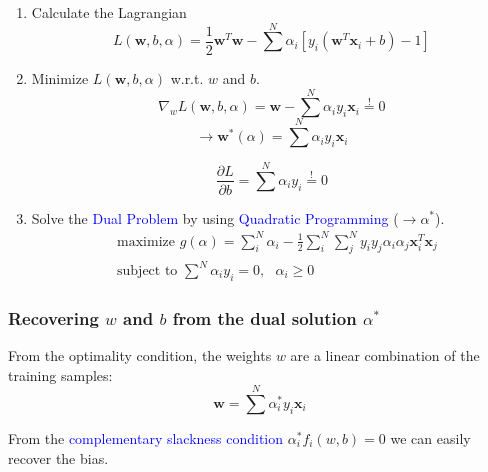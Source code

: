 \documentclass[a4paper,10pt,twoside=true,DIV=10,headsepline,plainheadsepline]{scrartcl}
\begin{document}
		\begin{enumerate}
			\item Calculate the Lagrangian
				\begin{equation} 
					L(\mathbf{w}, b, \alpha) = \frac{1}{2} \mathbf{w}^T \mathbf{w} - \sum^N \alpha_i [y_i(\mathbf{w}^T \mathbf{x}_i + b) - 1]
				\end{equation}
			\item Minimize $L(\mathbf{w}, b, \alpha)$ w.r.t. $w$ and $b$.
				\begin{equation} 
					\nabla_w L(\mathbf{w}, b, \alpha) = \mathbf{w} - \sum^N \alpha_i y_i \mathbf{x}_i \overset{!}{=} 0
				\end{equation}
				\begin{equation} 
					\rightarrow \mathbf{w}^*(\alpha) = \sum^N \alpha_i y_i \mathbf{x}_i
				\end{equation}

				\begin{equation} 
					\frac{\partial L}{\partial b} = \sum^N \alpha_i y_i \overset{!}{=} 0
				\end{equation}

			\item Solve the \textcolor{blue}{Dual Problem} by using \textcolor{blue}{Quadratic Programming} ($\rightarrow \alpha^*$).
				\begin{align}
				&\textrm{maximize } g(\alpha) = \sum_i^N \alpha_i - \frac{1}{2} \sum_i^N \sum_j^N y_i y_j \alpha_i \alpha_j \mathbf{x}_i^T \mathbf{x}_j \\
				&\textrm{subject to } \sum^N \alpha_i y_i = 0, \textrm{ } \alpha_i \geq 0
			\end{align}
		\end{enumerate}

		\subsubsection{Recovering $w$ and $b$ from the dual solution $\alpha^*$}
	
		From the optimality condition, the weights $w$ are a linear combination of the training samples:
		\begin{equation} 
			\mathbf{w} = \sum^N \alpha_i^* y_i \mathbf{x}_i
		\end{equation}

		From the \textcolor{blue}{complementary slackness condition} $\alpha_i^* f_i(w,b) = 0$ we can easily recover the bias.
		\newline
\end{document}
